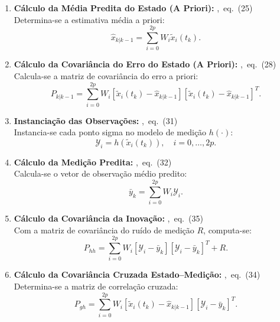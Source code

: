 \documentclass{article}
\newcommand{\stepref}[1]{\hfill\mbox{\footnotesize\normalfont\textsf{\cite{biswas2017}, #1}}}
\begin{document}
\begin{algorithmbox}
\begin{enumerate}[leftmargin=*, itemsep=6pt]
    \item \textbf{C\'alculo da M\'edia Predita do Estado (A Priori):} \stepref{eq.~(25)} \\
    Determina-se a estimativa m\'edia a priori:
    \begin{equation}
        \hat{x}_{k|k-1} = \sum_{i=0}^{2p} W_i \tilde{x}_i(t_k).
    \end{equation}

    \item \textbf{C\'alculo da Covari\^ancia do Erro do Estado (A Priori):} \stepref{eq.~(28)} \\
    Calcula-se a matriz de covari\^ancia do erro a priori:
    \begin{equation}
        P_{k|k-1} = \sum_{i=0}^{2p} W_i \left[\tilde{x}_i(t_k) - \hat{x}_{k|k-1}\right] \left[\tilde{x}_i(t_k) - \hat{x}_{k|k-1}\right]^T.
    \end{equation}

    \item \textbf{Instancia\c{c}\~ao das Observa\c{c}\~oes:} \stepref{eq.~(31)} \\
    Instancia-se cada ponto sigma no modelo de medi\c{c}\~ao $h(\cdot)$:
    \begin{equation}
        \mathcal{Y}_i = h\left(\tilde{x}_i(t_k)\right), \quad i = 0, \dots, 2p.
    \end{equation}

    \item \textbf{C\'alculo da Medi\c{c}\~ao Predita:} \stepref{eq.~(32)} \\
    Calcula-se o vetor de observa\c{c}\~ao m\'edio predito:
    \begin{equation}
        \bar{y}_k = \sum_{i=0}^{2p} W_i \mathcal{Y}_i.
    \end{equation}

    \item \textbf{C\'alculo da Covari\^ancia da Inova\c{c}\~ao:} \stepref{eq.~(35)} \\
    Com a matriz de covari\^ancia do ru\'ido de medi\c{c}\~ao $R$, computa-se:
    \begin{equation}
        P_{hh} = \sum_{i=0}^{2p} W_i \left[\mathcal{Y}_i - \bar{y}_k\right] \left[\mathcal{Y}_i - \bar{y}_k\right]^T + R.
    \end{equation}

    \item \textbf{C\'alculo da Covari\^ancia Cruzada Estado--Medi\c{c}\~ao:} \stepref{eq.~(34)} \\
    Determina-se a matriz de correla\c{c}\~ao cruzada:
    \begin{equation}
        P_{gh} = \sum_{i=0}^{2p} W_i \left[\tilde{x}_i(t_k) - \hat{x}_{k|k-1}\right] \left[\mathcal{Y}_i - \bar{y}_k\right]^T.
    \end{equation}


\end{enumerate}
\end{algorithmbox}
\end{document}
